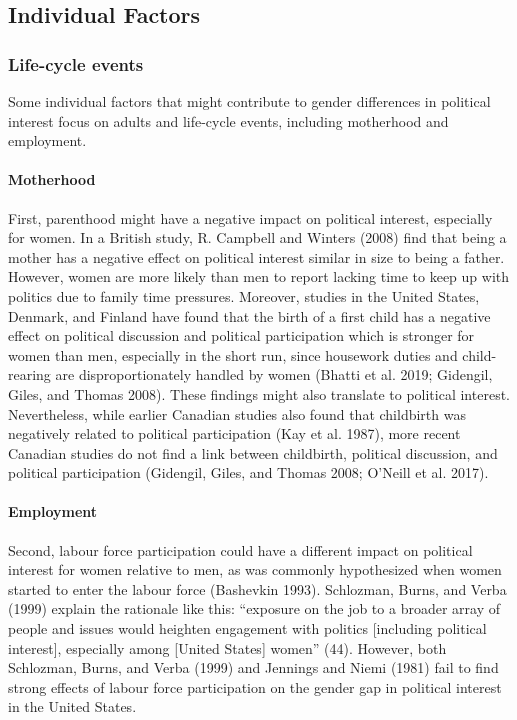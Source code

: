 \documentclass[
  letterpaper,
  DIV=11,
  numbers=noendperiod]{scrreprt}
\let\oldparagraph\paragraph
\renewcommand{\paragraph}[1]{\oldparagraph{#1}\mbox{}}
\begin{document}
\hypertarget{individual-factors}{%
\subsection{Individual Factors}\label{individual-factors}}

\hypertarget{life-cycle-events}{%
\subsubsection{Life-cycle events}\label{life-cycle-events}}

Some individual factors that might contribute to gender differences in
political interest focus on adults and life-cycle events, including
motherhood and employment.

\hypertarget{motherhood}{%
\paragraph{Motherhood}\label{motherhood}}

First, parenthood might have a negative impact on political interest,
especially for women. In a British study, R. Campbell and Winters (2008)
find that being a mother has a negative effect on political interest
similar in size to being a father. However, women are more likely than
men to report lacking time to keep up with politics due to family time
pressures. Moreover, studies in the United States, Denmark, and Finland
have found that the birth of a first child has a negative effect on
political discussion and political participation which is stronger for
women than men, especially in the short run, since housework duties and
child-rearing are disproportionately handled by women (Bhatti et al.
2019; Gidengil, Giles, and Thomas 2008). These findings might also
translate to political interest. Nevertheless, while earlier Canadian
studies also found that childbirth was negatively related to political
participation (Kay et al. 1987), more recent Canadian studies do not
find a link between childbirth, political discussion, and political
participation (Gidengil, Giles, and Thomas 2008; O'Neill et al. 2017).

\hypertarget{employment}{%
\paragraph{Employment}\label{employment}}

Second, labour force participation could have a different impact on
political interest for women relative to men, as was commonly
hypothesized when women started to enter the labour force (Bashevkin
1993). Schlozman, Burns, and Verba (1999) explain the rationale like
this: ``exposure on the job to a broader array of people and issues
would heighten engagement with politics {[}including political
interest{]}, especially among {[}United States{]} women'' (44). However,
both Schlozman, Burns, and Verba (1999) and Jennings and Niemi (1981)
fail to find strong effects of labour force participation on the gender
gap in political interest in the United States.
\end{document}
